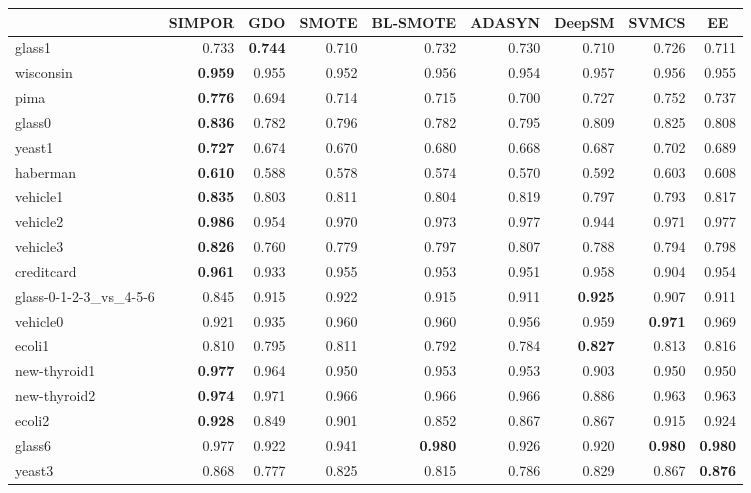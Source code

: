 \begin{table}[!hhbp]
{		\begin{tabular}{lrrrrrrrr}
			\toprule
			& \multicolumn{1}{c}{SIMPOR} & \multicolumn{1}{c}{GDO} & \multicolumn{1}{c}{SMOTE} & \multicolumn{1}{c}{BL-SMOTE} & \multicolumn{1}{c}{ADASYN} & \multicolumn{1}{c}{DeepSM} & \multicolumn{1}{c}{SVMCS} & \multicolumn{1}{c}{EE} \\
			\midrule
			glass1 & 0.733 & \textbf{0.744} & 0.710 & 0.732 & 0.730 & 0.710 & 0.726 & 0.711 \\
			wisconsin & \textbf{0.959} & 0.955 & 0.952 & 0.956 & 0.954 & 0.957 & 0.956 & 0.955 \\
			pima  & \textbf{0.776} & 0.694 & 0.714 & 0.715 & 0.700 & 0.727 & 0.752 & 0.737 \\
			glass0 & \textbf{0.836} & 0.782 & 0.796 & 0.782 & 0.795 & 0.809 & 0.825 & 0.808 \\
			yeast1 & \textbf{0.727} & 0.674 & 0.670 & 0.680 & 0.668 & 0.687 & 0.702 & 0.689 \\
			haberman & \textbf{0.610} & 0.588 & 0.578 & 0.574 & 0.570 & 0.592 & 0.603 & 0.608 \\
			vehicle1 & \textbf{0.835} & 0.803 & 0.811 & 0.804 & 0.819 & 0.797 & 0.793 & 0.817 \\
			vehicle2 & \textbf{0.986} & 0.954 & 0.970 & 0.973 & 0.977 & 0.944 & 0.971 & 0.977 \\
			vehicle3 & \textbf{0.826} & 0.760 & 0.779 & 0.797 & 0.807 & 0.788 & 0.794 & 0.798 \\
			creditcard & \textbf{0.961} & 0.933 & 0.955 & 0.953 & 0.951 & 0.958 & 0.904 & 0.954 \\
			glass-0-1-2-3\_vs\_4-5-6 & 0.845 & 0.915 & 0.922 & 0.915 & 0.911 & \textbf{0.925} & 0.907 & 0.911 \\
			vehicle0 & 0.921 & 0.935 & 0.960 & 0.960 & 0.956 & 0.959 & \textbf{0.971} & 0.969 \\
			ecoli1 & 0.810 & 0.795 & 0.811 & 0.792 & 0.784 & \textbf{0.827} & 0.813 & 0.816 \\
			new-thyroid1 & \textbf{0.977} & 0.964 & 0.950 & 0.953 & 0.953 & 0.903 & 0.950 & 0.950 \\
			new-thyroid2 & \textbf{0.974} & 0.971 & 0.966 & 0.966 & 0.966 & 0.886 & 0.963 & 0.963 \\
			ecoli2 & \textbf{0.928} & 0.849 & 0.901 & 0.852 & 0.867 & 0.867 & 0.915 & 0.924 \\
			glass6 & 0.977 & 0.922 & 0.941 & \textbf{0.980} & 0.926 & 0.920 & \textbf{0.980} & \textbf{0.980} \\
			yeast3 & 0.868 & 0.777 & 0.825 & 0.815 & 0.786 & 0.829 & 0.867 & \textbf{0.876} \\

\end{tabular}}
\end{table}

